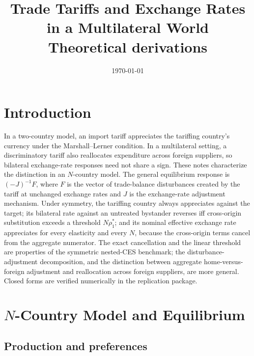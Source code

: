 \documentclass[11pt]{article}
\title{Trade Tariffs and Exchange Rates in a Multilateral World\\ \large Theoretical derivations}
\author{}
\date{\today}
\begin{document}
\maketitle

\section{Introduction}

In a two-country model, an import tariff appreciates the tariffing country's currency under the Marshall--Lerner condition. In a multilateral setting, a discriminatory tariff also reallocates expenditure across foreign suppliers, so bilateral exchange-rate responses need not share a sign. These notes characterize the distinction in an $N$-country model. The general equilibrium response is $(-J)^{-1}F$, where $F$ is the vector of trade-balance disturbances created by the tariff at unchanged exchange rates and $J$ is the exchange-rate adjustment mechanism. Under symmetry, the tariffing country always appreciates against the target; its bilateral rate against an untreated bystander reverses iff cross-origin substitution exceeds a threshold $N\rho_1^*$; and its nominal effective exchange rate appreciates for every elasticity and every $N$, because the cross-origin terms cancel from the aggregate numerator. The exact cancellation and the linear threshold are properties of the symmetric nested-CES benchmark; the disturbance-adjustment decomposition, and the distinction between aggregate home-versus-foreign adjustment and reallocation across foreign suppliers, are more general. Closed forms are verified numerically in the replication package.

\section{$N$-Country Model and Equilibrium}

\subsection{Production and preferences}
\end{document}
